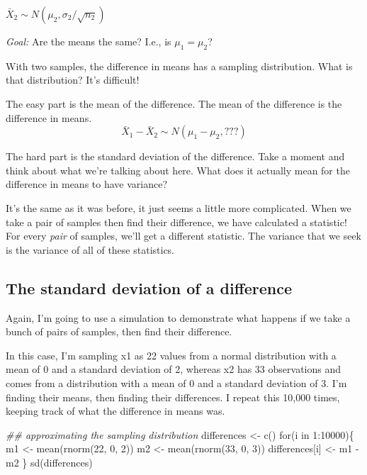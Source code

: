 \documentclass[
  letterpaper,
  DIV=11,
  numbers=noendperiod,
  oneside]{scrreprt}
\newenvironment{Shaded}{\begin{snugshade}}{\end{snugshade}}
\newcommand{\ControlFlowTok}[1]{\textcolor[rgb]{0.00,0.23,0.31}{#1}}
\newcommand{\DecValTok}[1]{\textcolor[rgb]{0.68,0.00,0.00}{#1}}
\newcommand{\DocumentationTok}[1]{\textcolor[rgb]{0.37,0.37,0.37}{\textit{#1}}}
\newcommand{\FunctionTok}[1]{\textcolor[rgb]{0.28,0.35,0.67}{#1}}
\newcommand{\NormalTok}[1]{\textcolor[rgb]{0.00,0.23,0.31}{#1}}
\newcommand{\OtherTok}[1]{\textcolor[rgb]{0.00,0.23,0.31}{#1}}
\newcommand{\SpecialCharTok}[1]{\textcolor[rgb]{0.37,0.37,0.37}{#1}}
\begin{document}
\(\bar X_2\sim N(\mu_2, \sigma_2/\sqrt{n_2})\) \pause

\quad

\emph{Goal:} Are the means the same? I.e., is \(\mu_1 = \mu_2\)?

With two samples, the difference in means has a sampling distribution.
What is that distribution? It's difficult!

The easy part is the mean of the difference. The mean of the difference
is the difference in means. \[
\bar X_1 - \bar X_2 \sim N(\mu_1 - \mu_2, ???)
\]

The hard part is the standard deviation of the difference. Take a moment
and think about what we're talking about here. What does it actually
mean for the difference in means to have variance?

It's the same as it was before, it just seems a little more complicated.
When we take a pair of samples then find their difference, we have
calculated a statistic! For every \emph{pair} of samples, we'll get a
different statistic. The variance that we seek is the variance of all of
these statistics.

\hypertarget{the-standard-deviation-of-a-difference}{%
\subsection{The standard deviation of a
difference}\label{the-standard-deviation-of-a-difference}}

Again, I'm going to use a simulation to demonstrate what happens if we
take a bunch of pairs of samples, then find their difference.

In this case, I'm sampling x1 as 22 values from a normal distribution
with a mean of 0 and a standard deviation of 2, whereas x2 has 33
observations and comes from a distribution with a mean of 0 and a
standard deviation of 3. I'm finding their means, then finding their
differences. I repeat this 10,000 times, keeping track of what the
difference in means was.

\begin{Shaded}
\begin{Highlighting}[]
\DocumentationTok{\#\# approximating the sampling distribution}
\NormalTok{differences }\OtherTok{\textless{}{-}} \FunctionTok{c}\NormalTok{()}
\ControlFlowTok{for}\NormalTok{(i }\ControlFlowTok{in} \DecValTok{1}\SpecialCharTok{:}\DecValTok{10000}\NormalTok{)\{}
\NormalTok{    m1 }\OtherTok{\textless{}{-}} \FunctionTok{mean}\NormalTok{(}\FunctionTok{rnorm}\NormalTok{(}\DecValTok{22}\NormalTok{, }\DecValTok{0}\NormalTok{, }\DecValTok{2}\NormalTok{))}
\NormalTok{    m2 }\OtherTok{\textless{}{-}} \FunctionTok{mean}\NormalTok{(}\FunctionTok{rnorm}\NormalTok{(}\DecValTok{33}\NormalTok{, }\DecValTok{0}\NormalTok{, }\DecValTok{3}\NormalTok{))}
\NormalTok{    differences[i] }\OtherTok{\textless{}{-}}\NormalTok{ m1 }\SpecialCharTok{{-}}\NormalTok{ m2}
\NormalTok{\}}
\FunctionTok{sd}\NormalTok{(differences)}
\end{Highlighting}
\end{Shaded}
\end{document}
